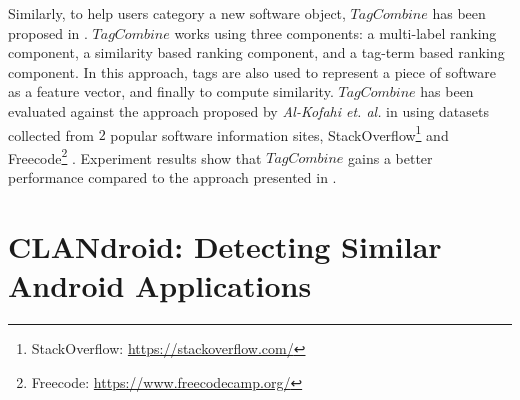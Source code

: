 Similarly, to help users category a new software object, $TagCombine$ has been proposed in \cite{xia:tag:2013}. $TagCombine$ works using three components: a multi-label ranking component, a similarity based ranking component, and a tag-term based ranking component. In this approach, tags are also used to represent a piece of software as a feature vector, and finally to compute similarity. $TagCombine$ has been evaluated against the approach proposed by \emph{Al-Kofahi et. al.} in \cite{Al-Kofahi:2010:FSA:1912607.1913281} using datasets collected from $2$ popular software information sites, StackOverflow\footnote{StackOverflow: \url{https://stackoverflow.com/}} and Freecode\footnote{Freecode: \url{https://www.freecodecamp.org/}} \cite{xia:tag:2013}. Experiment results show that $TagCombine$ gains a better performance compared to the approach presented in \cite{Al-Kofahi:2010:FSA:1912607.1913281}. 







%


\section{CLANdroid: Detecting Similar Android Applications}\label{sec:clandroid}

